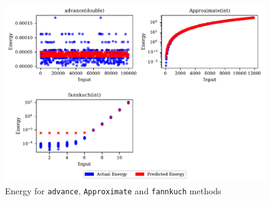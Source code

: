 \begin{figure}[htbp]
  \centering
  \includegraphics[width=\textwidth]{figures/benchmark_energy_panel_plot.pdf}
  \caption{Energy for \texttt{advance}, \texttt{Approximate} and \texttt{fannkuch} methods}
  \label{fig:benchmark_energy_panel_plot}
\end{figure}



